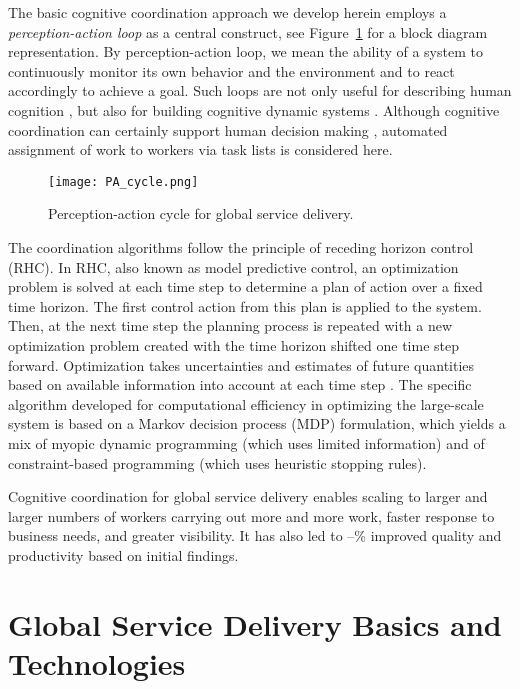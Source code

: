 \documentclass[10pt,journal,cspaper,compsoc]{IEEEtran}
\begin{document}
The basic cognitive coordination approach we develop herein employs a \emph{perception-action loop} as a central 
construct, see Figure~\ref{fig:PA_cycle} for a block diagram representation.  
By perception-action loop, we mean the ability of a system to continuously monitor its own behavior
and the environment and to react accordingly to achieve a goal.  Such loops are not only useful for describing 
human cognition \cite{KlyubinPN2007}, but also for building cognitive dynamic systems \cite{Haykin2012,Haykin2014,HaykinF2014}.
Although cognitive coordination can certainly support human decision making \cite{OppenheimBRC2011a},
automated assignment of work to workers via task lists is considered here.  

\begin{figure}
  \centering
  \texttt{[image: PA\_cycle.png]}
  \caption{Perception-action cycle for global service delivery.}
  \label{fig:PA_cycle}
\end{figure}

The coordination algorithms follow the principle of receding horizon control (RHC).  In RHC, also known as model predictive control, 
an optimization problem is solved at each time step to determine a plan of action over a fixed time horizon.  The 
first control action from this plan is applied to the system. Then, at the next time step the planning process is 
repeated with a new optimization problem created with the time horizon shifted one time step forward.  Optimization 
takes uncertainties and estimates of future quantities based on available information into account at each time step \cite{MattingleyWB2011}.  
The specific algorithm developed for computational efficiency in optimizing the large-scale system is based on a
Markov decision process (MDP) formulation, which yields a mix of myopic dynamic programming (which uses limited 
information) and of constraint-based programming (which uses heuristic stopping rules).

Cognitive coordination for global service delivery enables scaling to larger and larger numbers
of workers carrying out more and more work, faster response to business needs, and greater visibility.  It has also 
led to --\% improved quality and productivity based on initial findings.

\section{Global Service Delivery Basics and Technologies}
\end{document}
